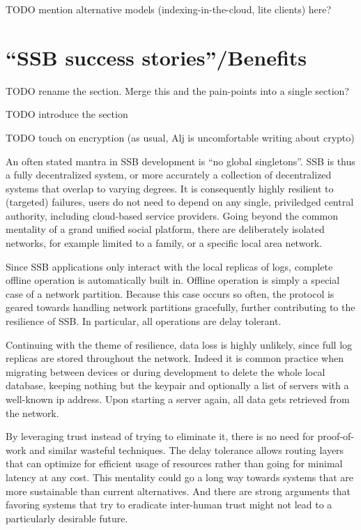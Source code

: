 \documentclass[sigconf]{acmart}
\begin{document}
TODO mention alternative models (indexing-in-the-cloud, lite clients) here?

\section{``SSB success stories''/Benefits}

TODO rename the section. Merge this and the pain-points into a single section?

TODO introduce the section

TODO touch on encryption (as usual, Alj is uncomfortable writing about crypto)

An often stated mantra in SSB development is ``no global singletons''. SSB is thus a fully decentralized system, or more accurately a collection of decentralized systems that overlap to varying degrees. It is consequently highly resilient to (targeted) failures, users do not need to depend on any single, priviledged central authority, including cloud-based service providers. Going beyond the common mentality of a grand unified social platform, there are deliberately isolated networks, for example limited to a family, or a specific local area network.

Since SSB applications only interact with the local replicas of logs, complete offline operation is automatically built in. Offline operation is simply a special case of a network partition. Because this case occurs so often, the protocol is geared towards handling network partitions gracefully, further contributing to the resilience of SSB. In particular, all operations are delay tolerant.

Continuing with the theme of resilience, data loss is highly unlikely, since full log replicas are stored throughout the network. Indeed it is common practice when migrating between devices or during development to delete the whole local database, keeping nothing but the keypair and optionally a list of servers with a well-known ip address. Upon starting a server again, all data gets retrieved from the network.


By leveraging trust instead of trying to eliminate it, there is no need for proof-of-work and similar wasteful techniques. The delay tolerance allows routing layers that can optimize for efficient usage of resources rather than going for minimal latency at any cost. This mentality could go a long way towards systems that are more sustainable than current alternatives. And there are strong arguments that favoring systems that try to eradicate inter-human trust might not lead to a particularly desirable future.
\end{document}
